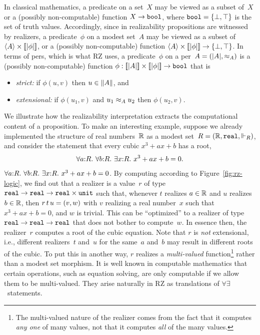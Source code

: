 In classical mathematics, a predicate on a set~$X$ may be viewed as a
subset of~$X$ or a (possibly non-computable) function $X \to \mathtt{bool}$,
where $\mathtt{bool} = \{\bot, \top\}$ is the set of truth values.
Accordingly, since in realizability propositions are witnessed by
realizers, a predicate~$\phi$ on a modest set~$A$ may be viewed as a
subset of $\langle A \rangle \times [\![|\phi|]\!]$, or a (possibly
non-computable) function $\langle A \rangle \times [\![|\phi|]\!] \to
\{\bot, \top\}$. In terms of pers, which is what RZ uses, a
predicate~$\phi$ on a per~$A = (|A|, {\approx_A})$ is a (possibly
non-computable) function $\phi : [\![|A|]\!] \times
[\![|\phi|]\!] \to \mathtt{bool}$ that is
%
\begin{itemize}
\item \emph{strict:} if $\phi(u,v)$ then $u \in \|A\|$, and
\item \emph{extensional:} if $\phi(u_1,v)$ and $u_1 \approx_A u_2$ then
  $\phi(u_2,v)$.
\end{itemize}

We illustrate how the realizability interpretation extracts the
computational content of a proposition. To make an interesting
example, suppose we already implemented the structure of real
numbers~$\mathbb{R}$ as a modest set~$R = (\mathbb{R}, \mathtt{real}, {\Vdash_R})$, and
consider the statement 
\iflong
that every cubic $x^3 + a x + b$ has a root,
%
\begin{equation}
  \label{eq:square-root}%
  \iforall{a}{R}{\iforall{b}{R}{\iexists{x}{R}{\iequal{x^3 + a x + b}{0}}}}.
\end{equation}
\else %
$\forall a{:}R.\ \forall b{:}R.\ \exists x{:}R.\ x^3 + a x + b = 0$.
\fi %
%
By computing according to Figure~\ref{fig:rz-logic}, we find out that
a realizer is a value~$r$ of type
$\mathtt{real} \to \mathtt{real} \to \mathtt{real} \times \mathtt{unit}$
such that, whenever $t$ realizes $a \in \mathbb{R}$ and $u$ realizes $b \in
\mathbb{R}$, then $r\,t\,u = (v, w)$ with $v$ realizing a real
number~$x$ such that $x^3 + a x + b = 0$, and $w$ is trivial. This
can be ``optimized'' to a realizer of type
$\mathtt{real} \to \mathtt{real} \to \mathtt{real}$ that
does not bother to compute~$w$. In essence then, the realizer~$r$
computes a root of the cubic equation. Note
that $r$ is \emph{not} extensional, i.e., different realizers~$t$
and~$u$ for the same~$a$ and~$b$ may result in different roots of the
cubic. To put this in another way, $r$ realizes a \emph{multi-valued}
function\footnote{The multi-valued nature of the realizer comes from
  the fact that it computes \emph{any one} of many values, not that it
  computes \emph{all} of the many values.} rather than a modest set
morphism. It is well known in computable mathematics that certain
operations, such as equation solving, are only computable if we allow
them to be multi-valued. They arise naturally in RZ as translations of
$\forall\exists$~statements.

